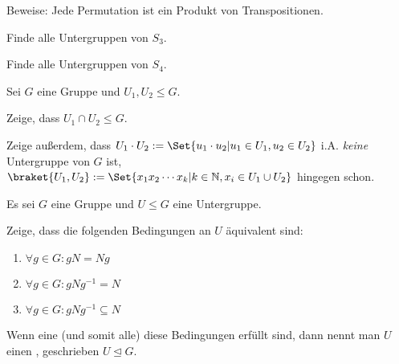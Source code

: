 \begin{sheet}
\begin{problem}[title={Zyklenzerlegung}]
\begin{subproblem}[difficulty={mittel}]
Beweise: Jede Permutation ist ein Produkt von Transpositionen.
\end{subproblem}
\end{problem}

\begin{problem}
\begin{subproblem}[difficulty={leicht}]
Finde alle Untergruppen von $S_3$.
\end{subproblem}
\begin{subproblem}[difficulty={leicht, aber aufwändig}]
Finde alle Untergruppen von $S_4$.
\end{subproblem}
\end{problem}




\begin{problem}[title={Neue Untergruppen aus alten}]
Sei $G$ eine Gruppe und $U_1,U_2\leq G$.
\begin{subproblem}[difficulty={sehr leicht}]
Zeige, dass $U_1\cap U_2\leq G$.
\end{subproblem}
\begin{subproblem}[difficulty={leicht}]
Zeige außerdem, dass $U_1\cdot U_2 := \Set{u_1\cdot u_2 | u_1\in U_1, u_2\in U_2}$ i.A. \emph{keine} Untergruppe von $G$ ist, $\braket{U_1,U_2} := \Set{x_1 x_2 \cdots x_k | k\in\IN, x_i\in U_1\cup U_2}$ hingegen schon.
\end{subproblem}
\end{problem}

\begin{problem}
Es sei $G$ eine Gruppe und $U\leq G$ eine Untergruppe.
\begin{subproblem}[difficulty={leicht}]
Zeige, dass die folgenden Bedingungen an $U$ äquivalent sind:
\begin{enumerate}[label=(\roman*)]
\item $\forall g\in G: gN=Ng$
\item $\forall g\in G: gNg^{-1} = N$
\item $\forall g\in G: gNg^{-1} \subseteq N$
\end{enumerate}
\end{subproblem}
Wenn eine (und somit alle) diese Bedingungen erfüllt sind, dann nennt man $U$ einen , geschrieben $U\unlhd G$.


\end{problem}
\end{sheet}
